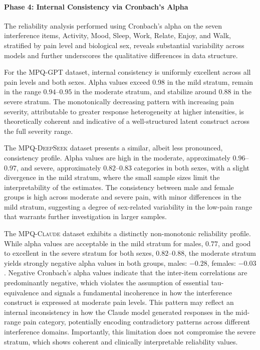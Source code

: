 \documentclass[preprint,12pt,authoryear]{elsarticle}
\newcommand{\dbGPT}{\small\textsc{MPQ-GPT}\xspace}
\newcommand{\dbClaude}{\small\textsc{MPQ-Claude}\xspace}
\newcommand{\dbDeepSeek}{\small\textsc{MPQ-DeepSeek}\xspace}
\begin{document}
\paragraph{Phase 4: Internal Consistency via Cronbach's Alpha}

The reliability analysis performed using Cronbach's alpha on the seven interference items, Activity, Mood, Sleep, Work, Relate, Enjoy, and Walk, stratified by pain level and biological sex, reveals substantial variability across models and further underscores the qualitative differences in data structure.

For the \dbGPT dataset, internal consistency is uniformly excellent across all pain levels and both sexes. Alpha values exceed 0.98 in the mild stratum, remain in the range $0.94$--$0.95$ in the moderate stratum, and stabilize around $0.88$ in the severe stratum. The monotonically decreasing pattern with increasing pain severity, attributable to greater response heterogeneity at higher intensities, is theoretically coherent and indicative of a well-structured latent construct across the full severity range.

The \dbDeepSeek dataset presents a similar, albeit less pronounced, consistency profile. Alpha values are high in the moderate, approximately $0.96$--$0.97$, and severe, approximately $0.82$--$0.83$ categories in both sexes, with a slight divergence in the mild stratum, where the small sample sizes limit the interpretability of the estimates. The consistency between male and female groups is high across moderate and severe pain, with minor differences in the mild stratum, suggesting a degree of sex-related variability in the low-pain range that warrants further investigation in larger samples.

The \dbClaude dataset exhibits a distinctly non-monotonic reliability profile. While alpha values are acceptable in the mild stratum for males, $0.77$, and good to excellent in the severe stratum for both sexes, $0.82$--$0.88$, the moderate stratum yields strongly negative alpha values in both groups, males: $-0.28$, females: $-0.03$. Negative Cronbach's alpha values indicate that the inter-item correlations are predominantly negative, which violates the assumption of essential tau-equivalence and signals a fundamental incoherence in how the interference construct is expressed at moderate pain levels. This pattern may reflect an internal inconsistency in how the Claude model generated responses in the mid-range pain category, potentially encoding contradictory patterns across different interference domains. Importantly, this limitation does not compromise the severe stratum, which shows coherent and clinically interpretable reliability values.
\end{document}
